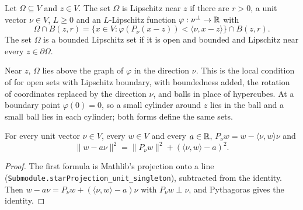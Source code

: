 \begin{definition}
\label{def:lipschitz-near-point}
\leanok
Let $\Omega \subseteq V$ and $z \in V$. The set $\Omega$ is Lipschitz near $z$ if there are
$r > 0$, a unit vector $\nu \in V$, $L \geq 0$ and an $L$-Lipschitz function
$\varphi : \nu^\perp \to \mathbb{R}$ with
\[
  \Omega \cap B(z, r)
  = \{x \in V : \varphi(P_\nu(x - z)) < \langle \nu, x - z \rangle\} \cap B(z, r) .
\]
The set $\Omega$ is a bounded Lipschitz set if it is open and bounded and Lipschitz near every
$z \in \partial\Omega$.
\end{definition}

Near $z$, $\Omega$ lies above the graph of $\varphi$ in the direction $\nu$. This is the local
condition of \cite[Definition 1.2.1.1]{Grisvard} for open sets with Lipschitz boundary, with
boundedness added, the rotation of coordinates replaced by the direction $\nu$, and balls in place
of hypercubes. At a boundary point $\varphi(0) = 0$, so a small cylinder around $z$ lies in the
ball and a small ball lies in each cylinder; both forms define the same sets.

\begin{lemma}
\label{lem:hyperplane-projection}
\leanok
For every unit vector $\nu \in V$, every $w \in V$ and every $a \in \mathbb{R}$,
$P_\nu w = w - \langle \nu, w \rangle \nu$ and
\[
  \|w - a \nu\|^2 = \|P_\nu w\|^2 + (\langle \nu, w \rangle - a)^2 .
\]
\end{lemma}

\begin{proof}
\leanok
The first formula is Mathlib's projection onto a line
(\texttt{Submodule.\allowbreak starProjection\_\allowbreak unit\_\allowbreak singleton}),
subtracted from the identity. Then
$w - a \nu = P_\nu w + (\langle \nu, w \rangle - a) \nu$ with $P_\nu w \perp \nu$, and Pythagoras
gives the identity.
\end{proof}

